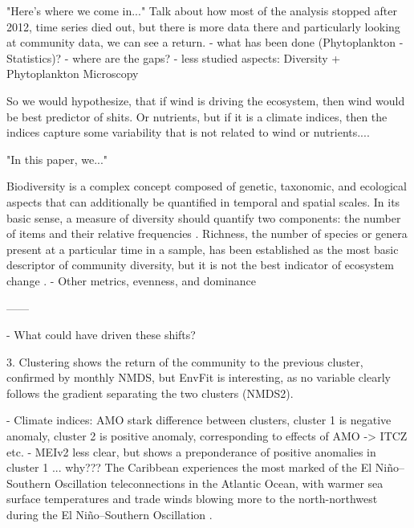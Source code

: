         "Here's where we come in..." Talk about how most of the analysis stopped after 2012, time series died out, but there is more data there and particularly looking at community data, we can see a return.
    - what has been done (Phytoplankton - Statistics)?
    - where are the gaps?
    - less studied aspects: Diversity + Phytoplankton Microscopy

    So we would hypothesize, that if wind is driving the ecosystem, then wind would be best predictor of shits.
    Or nutrients, but if it is a climate indices, then the indices capture some variability that is not related to wind or nutrients....
        
    
    "In this paper, we..." 





    Biodiversity is a complex concept composed of genetic, taxonomic, and ecological aspects that can additionally be quantified in temporal and spatial scales. In its basic sense, a measure of diversity should quantify two components: the number of items and their relative frequencies \cite{borics_freshwater_2021}. 
    Richness, the number of species or genera present at a particular time in a sample, has been established as the most basic descriptor of community diversity, but it is not the best indicator of ecosystem change \cite{hillebrand_biodiversity_2018}.
    - Other metrics, evenness, and dominance



    ------


    

- What could have driven these shifts?


3. Clustering shows the return of the community to the previous cluster, confirmed by monthly NMDS, but EnvFit is interesting, as no variable clearly follows the gradient separating the two clusters (NMDS2).

- Climate indices: AMO stark difference between clusters, cluster 1 is negative anomaly, cluster 2 is positive anomaly, corresponding to effects of AMO -> ITCZ etc.
- MEIv2 less clear, but shows a preponderance of positive anomalies in cluster 1 ... why???
The Caribbean experiences the most marked of the El Niño–Southern Oscillation teleconnections in the Atlantic Ocean, with warmer sea surface temperatures and trade winds blowing more to the north-northwest during the El Niño–Southern Oscillation \cite{enfield_tropical_1997}.

